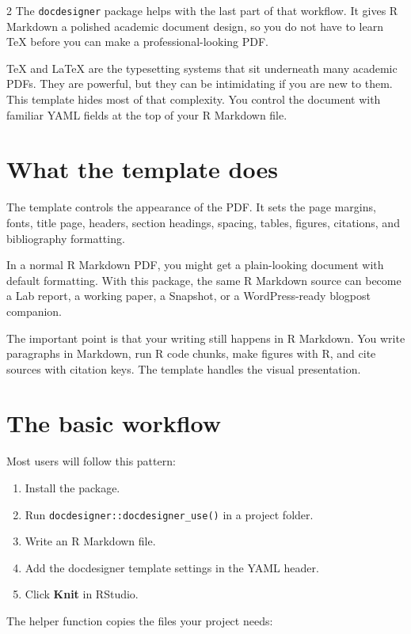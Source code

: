 \documentclass[12pt]{article}
\providecommand{\tightlist}{%
  \setlength{\itemsep}{0pt}%
  \setlength{\parskip}{0pt}%
}
\begin{document}
\begin{multicols}{2}
The \texttt{docdesigner} package helps with the last part of that workflow.
It gives R Markdown a polished academic document design, so you do not
have to learn TeX before you can make a professional-looking PDF.

TeX and LaTeX are the typesetting systems that sit underneath many
academic PDFs. They are powerful, but they can be intimidating if you
are new to them. This template hides most of that complexity. You
control the document with familiar YAML fields at the top of your R
Markdown file.

\section{What the template does}\label{what-the-template-does}

The template controls the appearance of the PDF. It sets the page
margins, fonts, title page, headers, section headings, spacing, tables,
figures, citations, and bibliography formatting.

In a normal R Markdown PDF, you might get a plain-looking document with
default formatting. With this package, the same R Markdown source can
become a Lab report, a working paper, a Snapshot, or a WordPress-ready
blogpost companion.

The important point is that your writing still happens in R Markdown.
You write paragraphs in Markdown, run R code chunks, make figures with
R, and cite sources with citation keys. The template handles the visual
presentation.

\section{The basic workflow}\label{the-basic-workflow}

Most users will follow this pattern:

\begin{enumerate}
\def\labelenumi{\arabic{enumi}.}
\tightlist
\item
  Install the package.
\item
  Run \texttt{docdesigner::docdesigner\_use()} in a project folder.
\item
  Write an R Markdown file.
\item
  Add the docdesigner template settings in the YAML header.
\item
  Click \textbf{Knit} in RStudio.
\end{enumerate}

The helper function copies the files your project needs:


\end{multicols}
\end{document}
